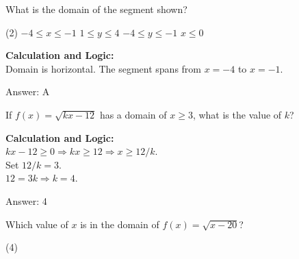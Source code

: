\documentclass[11pt,paper=a4,answers]{exam}
\begin{document}
\begin{questions}
\question
\begin{center}
\end{center}
What is the domain of the segment shown?
\begin{tasks}(2)
    \task $-4 \leq x \leq -1$
    \task $1 \leq y \leq 4$
    \task $-4 \leq y \leq -1$
    \task $x \leq 0$
\end{tasks}

\begin{solution}
\textbf{Calculation and Logic:} \\
Domain is horizontal. The segment spans from $x=-4$ to $x=-1$.

\vspace{30pt}

Answer: \colorbox{yellow!100}{A}
\end{solution}

\vspace{40pt}

\question
If $f(x) = \sqrt{kx - 12}$ has a domain of $x \geq 3$, what is the value of $k$?

\begin{solution}
\textbf{Calculation and Logic:} \\
$kx - 12 \geq 0 \Rightarrow kx \geq 12 \Rightarrow x \geq 12/k$. \\
Set $12/k = 3$. \\
$12 = 3k \Rightarrow k = 4$.

\vspace{30pt}

Answer: \colorbox{yellow!100}{4}
\end{solution}

\vspace{40pt}

\question
Which value of $x$ is in the domain of $f(x) = \sqrt{x-20}$?
\begin{tasks}(4)
\end{tasks}


\end{questions}
\end{document}
